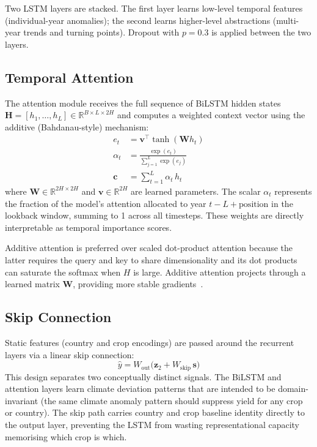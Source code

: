 \documentclass[conference]{IEEEtran}
\begin{document}
Two LSTM layers are stacked.
The first layer learns low-level temporal features (individual-year anomalies);
the second learns higher-level abstractions (multi-year trends and turning points).
Dropout with $p{=}0.3$ is applied between the two layers.

\subsection{Temporal Attention}
\label{sec:attention}

The attention module receives the full sequence of BiLSTM hidden states
$\mathbf{H} = [h_1, \ldots, h_L] \in \mathbb{R}^{B \times L \times 2H}$
and computes a weighted context vector using the additive (Bahdanau-style) mechanism:
\begin{align}
    e_t &= \mathbf{v}^\top \tanh(\mathbf{W} h_t)
    \label{eq:score} \\
    \alpha_t &= \frac{\exp(e_t)}{\sum_{j=1}^{L} \exp(e_j)}
    \label{eq:softmax} \\
    \mathbf{c} &= \sum_{t=1}^{L} \alpha_t\, h_t
    \label{eq:context}
\end{align}
where $\mathbf{W} \in \mathbb{R}^{2H \times 2H}$ and $\mathbf{v} \in \mathbb{R}^{2H}$
are learned parameters.
The scalar $\alpha_t$ represents the fraction of the model's attention allocated to
year $t-L+\text{position}$ in the lookback window, summing to 1 across all timesteps.
These weights are directly interpretable as temporal importance scores.

Additive attention is preferred over scaled dot-product attention because the latter
requires the query and key to share dimensionality and its dot products can saturate
the softmax when $H$ is large.
Additive attention projects through a learned matrix $\mathbf{W}$, providing more
stable gradients~\cite{bahdanau2015}.

\subsection{Skip Connection}
\label{sec:skip}

Static features (country and crop encodings) are passed around the recurrent layers
via a linear skip connection:
\begin{equation}
    \hat{y} = W_{\text{out}}\bigl(\mathbf{z}_2 + W_{\text{skip}}\,\mathbf{s}\bigr)
\end{equation}
This design separates two conceptually distinct signals.
The BiLSTM and attention layers learn climate deviation patterns that are intended to
be domain-invariant (the same climate anomaly pattern should suppress yield for any
crop or country).
The skip path carries country and crop baseline identity directly to the output layer,
preventing the LSTM from wasting representational capacity memorising which crop is which.
\end{document}
